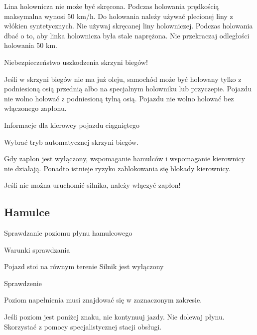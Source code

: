 \begin{itemizeTriangle}
	\itemTriangle Lina holownicza nie może być skręcona.
	\itemTriangle Podczas holowania prędkością maksymalna wynosi 50 km/h.
	\itemTriangle Do holowania należy używać plecionej liny z włókien syntetycznych. Nie używaj skręcanej liny holowniczej.
	\itemTriangle Podczas holowania dbać o to, aby linka holownicza była stale naprężona.
	\itemTriangle Nie przekraczaj odległości holowania 50 km.
\end{itemizeTriangle}

Niebezpieczeństwo uszkodzenia skrzyni biegów!
\begin{itemizeTriangle}
	\itemTriangle Jeśli w skrzyni biegów nie ma już oleju, samochód może być holowany tylko z podniesioną osią przednią albo na specjalnym holowniku lub przyczepie.
	\itemTriangle Pojazdu nie wolno holować z podniesioną tylną osią.
	\itemTriangle Pojazdu nie wolno holować bez włączonego zapłonu.
\end{itemizeTriangle}

Informacje dla kierowcy pojazdu ciągniętego
\begin{itemizeArrow}
	\itemArrow Wybrać tryb \gearN automatycznej skrzyni biegów.
\end{itemizeArrow}

Gdy zapłon jest wyłączony, wspomaganie hamulców i wspomaganie kierownicy nie działają. Ponadto istnieje ryzyko zablokowania się blokady kierownicy.
\begin{itemizeTriangle}
	\itemTriangle Jeśli nie można uruchomić silnika, należy włączyć zapłon!
\end{itemizeTriangle}

\subsection{Hamulce}

Sprawdzanie poziomu płynu hamulcowego

Warunki sprawdzania
\begin{itemizeTick}
	\itemTick Pojazd stoi na równym terenie
	\itemTick Silnik jest wyłączony
\end{itemizeTick}

Sprawdzenie

Poziom napełnienia musi znajdować się w zaznaczonym zakresie.
\begin{itemizeArrow}
	\itemArrow Jeśli poziom jest poniżej znaku, nie kontynuuj jazdy.
	\itemArrow Nie dolewaj płynu.
	\itemArrow Skorzystać z pomocy specjalistycznej stacji obsługi.
\end{itemizeArrow}

